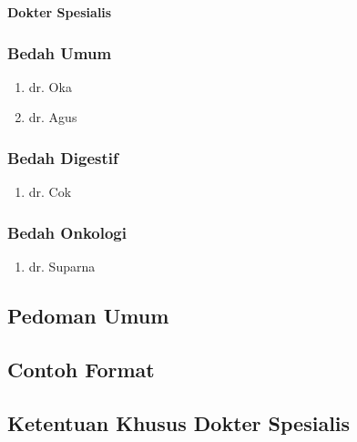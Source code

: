 \documentclass[
]{book}
\providecommand{\tightlist}{%
  \setlength{\itemsep}{0pt}\setlength{\parskip}{0pt}}
\begin{document}
\textbf{Dokter Spesialis}

\hypertarget{bedah-umum}{%
\subsubsection{Bedah Umum}\label{bedah-umum}}

\begin{enumerate}
\def\labelenumi{\arabic{enumi}.}
\tightlist
\item
  dr. Oka
\item
  dr. Agus
\end{enumerate}

\hypertarget{bedah-digestif}{%
\subsubsection{Bedah Digestif}\label{bedah-digestif}}

\begin{enumerate}
\def\labelenumi{\arabic{enumi}.}
\tightlist
\item
  dr. Cok
\end{enumerate}

\hypertarget{bedah-onkologi}{%
\subsubsection{Bedah Onkologi}\label{bedah-onkologi}}

\begin{enumerate}
\def\labelenumi{\arabic{enumi}.}
\tightlist
\item
  dr. Suparna
\end{enumerate}

\hypertarget{pedoman-umum-3}{%
\subsection{Pedoman Umum}\label{pedoman-umum-3}}

\hypertarget{contoh-format-3}{%
\subsection{Contoh Format}\label{contoh-format-3}}

\hypertarget{ketentuan-khusus-dokter-spesialis-2}{%
\subsection{Ketentuan Khusus Dokter Spesialis}\label{ketentuan-khusus-dokter-spesialis-2}}
\end{document}
